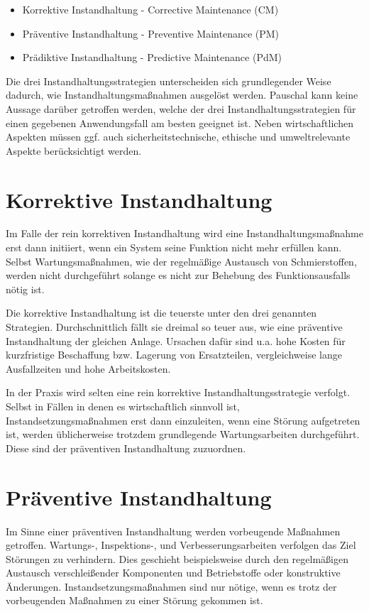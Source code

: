 \begin{itemize}
    \item Korrektive Instandhaltung - Corrective Maintenance (CM)
    \item Präventive Instandhaltung - Preventive Maintenance (PM)
    \item Prädiktive Instandhaltung - Predictive Maintenance (PdM)
\end{itemize}

Die drei Instandhaltungsstrategien unterscheiden sich grundlegender Weise dadurch, wie Instandhaltungsmaßnahmen ausgelöst werden. Pauschal kann keine Aussage darüber getroffen werden, welche der drei Instandhaltungsstrategien für einen gegebenen Anwendungsfall am besten geeignet ist. Neben wirtschaftlichen Aspekten müssen ggf. auch sicherheitstechnische, ethische und umweltrelevante Aspekte berücksichtigt werden.
\section{Korrektive Instandhaltung}
\label{sec:korrektive_instandhaltung}
Im Falle der rein korrektiven Instandhaltung wird eine Instandhaltungsmaßnahme erst dann initiiert, wenn ein System seine Funktion nicht mehr erfüllen kann. Selbst Wartungsmaßnahmen, wie der regelmäßige Austausch von Schmierstoffen, werden nicht durchgeführt solange es nicht zur Behebung des Funktionsausfalls nötig ist.~\cite[S.~2]{Mobley.2002}

Die korrektive Instandhaltung ist die teuerste unter den drei genannten Strategien. Durchschnittlich fällt sie dreimal so teuer aus, wie eine präventive Instandhaltung der gleichen Anlage. Ursachen dafür sind u.a. hohe Kosten für kurzfristige Beschaffung bzw. Lagerung von Ersatzteilen, vergleichweise lange Ausfallzeiten und hohe Arbeitskosten.~\cite[S.~3]{Mobley.2002}

In der Praxis wird selten eine rein korrektive Instandhaltungsstrategie verfolgt. Selbst in Fällen in denen es wirtschaftlich sinnvoll ist, Instandsetzungsmaßnahmen erst dann einzuleiten, wenn eine Störung aufgetreten ist, werden üblicherweise trotzdem grundlegende Wartungsarbeiten durchgeführt. Diese sind der präventiven Instandhaltung zuzuordnen.~\cite[S.~2]{Mobley.2002}
\section{Präventive Instandhaltung}
\label{sec:präventive_instandhaltung}
Im Sinne einer präventiven Instandhaltung werden vorbeugende Maßnahmen getroffen. Wartungs-, Inspektions-, und Verbesserungsarbeiten verfolgen das Ziel Störungen zu verhindern. Dies geschieht beispielsweise durch den regelmäßigen Austausch verschleißender Komponenten und Betriebstoffe oder konstruktive Änderungen. Instandsetzungsmaßnahmen sind nur nötige, wenn es trotz der vorbeugenden Maßnahmen zu einer Störung gekommen ist.

